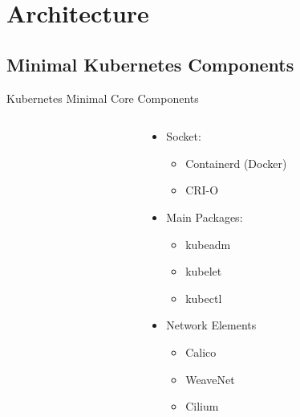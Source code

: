\section{Architecture} \label{sec:architecture}
\subsection{Minimal Kubernetes Components}

\begin{frame}{Kubernetes Minimal Core Components}
	\begin{columns}[T] %
		\begin{column}{5cm} %
		\end{column}
		\begin{column}{5cm} %
			\begin{itemize}
				\item<+-| alert@+> Socket:
				\begin{itemize}
						\item<+-| alert@+> Containerd (Docker)
						\item<+-| alert@+> CRI-O
					\end{itemize}
				\item<+-| alert@+> Main Packages:
				\begin{itemize}
					\item<+-| alert@+> kubeadm
					\item<+-| alert@+> kubelet
					\item<+-| alert@+> kubectl
				\end{itemize}
				\item<+-| alert@+> Network Elements
					\begin{itemize}
						\item<+-| alert@+> Calico~\cite{gnuLicences}
						\item<+-| alert@+> WeaveNet~\cite{gnuLicences}
						\item<+-| alert@+> Cilium~\cite{gnuLicences}
					\end{itemize}
			\end{itemize}
		\end{column}
	\end{columns}
\end{frame}

